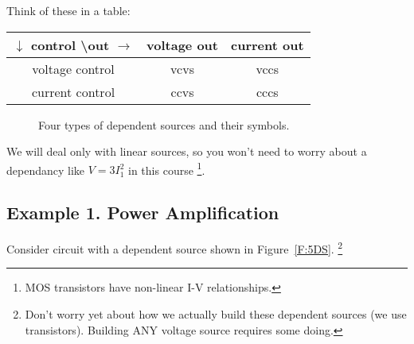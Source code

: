 Think of these in a table:
\begin{tabular}{|c|c|c|}\hline
$\downarrow$ control \textbackslash out $\rightarrow$ &voltage out&current out \\ \hline
voltage control&vcvs&vccs \\ \hline
current control&ccvs&cccs \\ \hline
\end{tabular}

\begin{figure}[H]
\begin{center}
\caption{Four types of dependent sources and their symbols.}
\end{center}
\end{figure}


We will deal only with linear sources, so you won't need to worry about a dependancy like $V=3I_1^2$ in this course \footnote{MOS transistors have non-linear I-V relationships.}.

\subsection{Example 1. Power Amplification}
Consider circuit with a dependent source shown in Figure~\ref{F:5DS}. \footnote{Don't worry yet about how we actually build these dependent sources (we use transistors). Building ANY voltage source requires some doing.}


